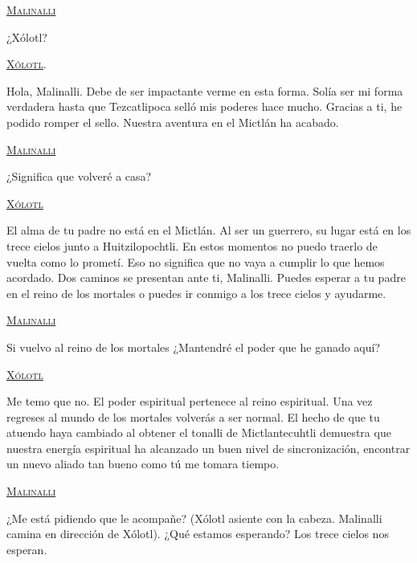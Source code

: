 \begin{center}
\textsc{\underline{Malinalli}}
\\
\par 
¿Xólotl?
\\
\par 
\textsc{\underline{Xólotl}}.
\\
\par 
Hola, Malinalli. Debe de ser impactante verme en esta forma. Solía ser mi forma verdadera hasta que Tezcatlipoca selló mis poderes hace mucho. Gracias a ti, he podido romper el sello. Nuestra aventura en el Mictlán ha acabado.
\\
\par 
\textsc{\underline{Malinalli}}
\\
\par 
¿Significa que volveré a casa?  
\\
\par 
\textsc{\underline{Xólotl}}
\\
\par 
El alma de tu padre no está en el Mictlán. Al ser un guerrero, su lugar está en los trece cielos junto a Huitzilopochtli. En estos momentos no puedo traerlo de vuelta como lo prometí. Eso no significa que no vaya a cumplir lo que hemos acordado. Dos caminos se presentan ante ti, Malinalli. Puedes esperar a tu padre en el reino de los mortales o puedes ir conmigo a los trece cielos y ayudarme. 
\\
\par 
\textsc{\underline{Malinalli}}
\\
\par 
Si vuelvo al reino de los mortales ¿Mantendré el poder que he ganado aquí?
\\
\par 
\textsc{\underline{Xólotl}}
\\
\par 
Me temo que no. El poder espiritual pertenece al reino espiritual. Una vez regreses al mundo de los mortales volverás a ser normal. El hecho de que tu atuendo haya cambiado al obtener el tonalli de Mictlantecuhtli demuestra que nuestra energía espiritual ha alcanzado un buen nivel de sincronización, encontrar un nuevo aliado tan bueno como tú me tomara tiempo.
\\
\par 
\textsc{\underline{Malinalli}}
\\
\par 
¿Me está pidiendo que le acompañe? (Xólotl asiente con la cabeza. Malinalli camina en dirección de Xólotl). ¿Qué estamos esperando? Los trece cielos nos esperan. 
\end{center}